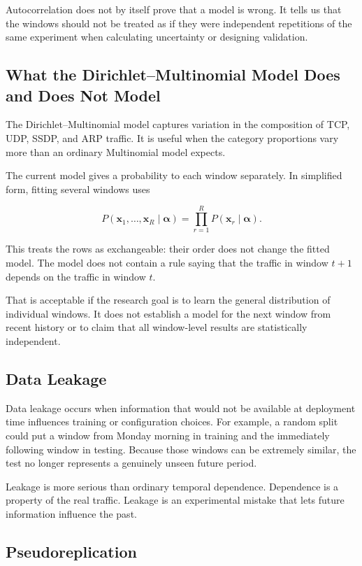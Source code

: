 \documentclass[11pt,a4paper]{article}
\begin{document}
Autocorrelation does not by itself prove that a model is wrong. It tells us that
the windows should not be treated as if they were independent repetitions of
the same experiment when calculating uncertainty or designing validation.

\subsection{What the Dirichlet--Multinomial Model Does and Does Not Model}

The Dirichlet--Multinomial model captures variation in the composition of TCP,
UDP, SSDP, and ARP traffic. It is useful when the category proportions vary
more than an ordinary Multinomial model expects.

The current model gives a probability to each window separately. In simplified
form, fitting several windows uses

\[
P(\mathbf{x}_1,\ldots,\mathbf{x}_R\mid\boldsymbol{\alpha})
=
\prod_{r=1}^{R}
P(\mathbf{x}_r\mid\boldsymbol{\alpha}).
\]

This treats the rows as exchangeable: their order does not change the fitted
model. The model does not contain a rule saying that the traffic in window
$t+1$ depends on the traffic in window $t$.

That is acceptable if the research goal is to learn the general distribution
of individual windows. It does not establish a model for the next
window from recent history or to claim that all window-level results are
statistically independent.

\subsection{Data Leakage}

Data leakage occurs when information that would not be available at deployment
time influences training or configuration choices. For example, a random split
could put a window from Monday morning in training and the immediately following
window in testing. Because those windows can be extremely similar, the test no
longer represents a genuinely unseen future period.

Leakage is more serious than ordinary temporal dependence. Dependence is a
property of the real traffic. Leakage is an experimental mistake that lets
future information influence the past.

\subsection{Pseudoreplication}
\end{document}
